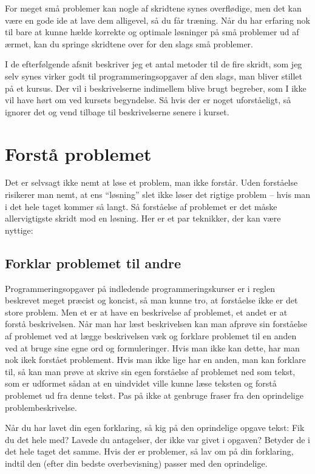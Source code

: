 \documentclass[a4paper,12pt]{article}
\begin{document}
For meget små problemer kan nogle af skridtene synes overflødige, men
det kan være en gode ide at lave dem alligevel, så du får træning.
Når du har erfaring nok til bare at kunne hælde korrekte og optimale
løsninger på små problemer ud af ærmet, kan du springe skridtene over
for den slags små problemer.

I de efterfølgende afsnit beskriver jeg et antal metoder til de fire
skridt, som jeg selv synes virker godt til programmeringsopgaver af
den slags, man bliver stillet på et kursus.  Der vil i beskrivelserne
indimellem blive brugt begreber, som I ikke vil have hørt om ved
kursets begyndelse.  Så hvis der er noget uforståeligt, så ignorer det
og vend tilbage til beskrivelserne senere i kurset.


\section{Forstå problemet}

Det er selvsagt ikke nemt at løse et problem, man ikke forstår.  Uden
forståelse risikerer man nemt, at ens ``løsning'' slet ikke løser det
rigtige problem -- hvis man i det hele taget kommer så langt.  Så
forståelse af problemet er det måske allervigtigste skridt mod en
løsning.  Her er et par teknikker, der kan være nyttige:

\subsection*{Forklar problemet til andre}

Programmeringsopgaver på indledende programmeringskurser er i reglen
beskrevet meget præcist og koncist, så man kunne tro, at forståelse
ikke er det store problem.  Men et er at have en beskrivelse af
problemet, et andet er at forstå beskrivelsen.  Når man har læst
beskrivelsen kan man afprøve sin forståelse af problemet ved at lægge
beskrivelsen væk og forklare problemet til en anden ved at bruge sine
egne ord og formuleringer.  Hvis man ikke kan dette, har man nok ikek
forstået problement.  Hvis man ikke lige har en anden, man kan
forklare til, så kan man prøve at skrive sin egen forståelse af
problemet ned som tekst, som er udformet sådan at en uindvidet ville
kunne læse teksten og forstå problemet ud fra denne tekst.  Pas på
ikke at genbruge fraser fra den oprindelige problembeskrivelse.

Når du har lavet din egen forklaring, så kig på den oprindelige opgave
tekst: Fik du det hele med?  Lavede du antagelser, der ikke var givet
i opgaven?  Betyder de i det hele taget det samme.  Hvis der er
problemer, så lav om på din forklaring, indtil den (efter din bedste
overbevisning) passer med den oprindelige.
\end{document}
